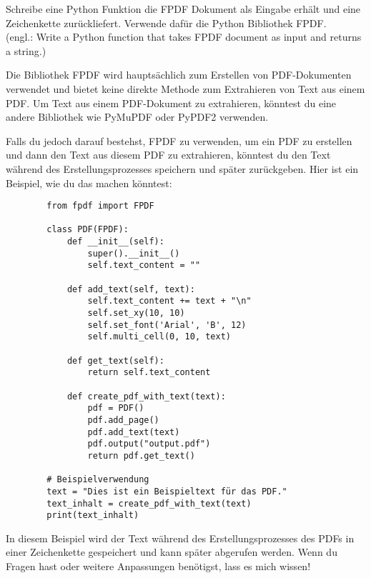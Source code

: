\newpage

\begin{tcolorbox}[
	enhanced,
	colback=BhtColorYellow!5!white,
	colframe=BhtColorYellow!75!black,
	title= Python Funktion
	]
	Schreibe eine Python Funktion die FPDF Dokument als Eingabe erhält und eine Zeichenkette zurückliefert. Verwende dafür die Python Bibliothek FPDF.\\
	(engl.: Write a Python function that takes FPDF document as input and returns a string.)
\end{tcolorbox}

\begin{tcolorbox}[
	enhanced,
	colback=BhtGrey!5!white,
	colframe=BhtGrey!75!black!50,
	title= Copilot
	]
	Die Bibliothek FPDF wird hauptsächlich zum Erstellen von PDF-Dokumenten verwendet und bietet keine direkte Methode zum Extrahieren von Text aus einem PDF. Um Text aus einem PDF-Dokument zu extrahieren, könntest du eine andere Bibliothek wie PyMuPDF oder PyPDF2 verwenden.
	
	Falls du jedoch darauf bestehst, FPDF zu verwenden, um ein PDF zu erstellen und dann den Text aus diesem PDF zu extrahieren, könntest du den Text während des Erstellungsprozesses speichern und später zurückgeben. Hier ist ein Beispiel, wie du das machen könntest:
	\begin{verbatim}
		from fpdf import FPDF
		
		class PDF(FPDF):
		    def __init__(self):
		        super().__init__()
		        self.text_content = ""
		
		    def add_text(self, text):
		        self.text_content += text + "\n"
		        self.set_xy(10, 10)
		        self.set_font('Arial', 'B', 12)
		        self.multi_cell(0, 10, text)
		
		    def get_text(self):
		        return self.text_content
		
		    def create_pdf_with_text(text):
		        pdf = PDF()
	            pdf.add_page()
		        pdf.add_text(text)
		        pdf.output("output.pdf")
		        return pdf.get_text()
		
		# Beispielverwendung
		text = "Dies ist ein Beispieltext für das PDF."
		text_inhalt = create_pdf_with_text(text)
		print(text_inhalt)
	\end{verbatim}
	In diesem Beispiel wird der Text während des Erstellungsprozesses des PDFs in einer Zeichenkette gespeichert und kann später abgerufen werden. Wenn du Fragen hast oder weitere Anpassungen benötigst, lass es mich wissen!
\end{tcolorbox}

